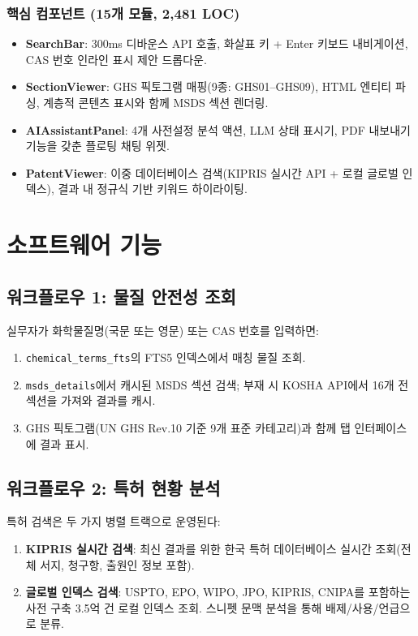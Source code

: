 \documentclass[preprint,12pt]{elsarticle}
\begin{document}
\subsubsection{핵심 컴포넌트 (15개 모듈, 2,481 LOC)}

\begin{itemize}
  \item \textbf{SearchBar}: 300ms 디바운스 API 호출, 화살표 키 + Enter 키보드 내비게이션, CAS 번호 인라인 표시 제안 드롭다운.
  \item \textbf{SectionViewer}: GHS 픽토그램 매핑(9종: GHS01--GHS09), HTML 엔티티 파싱, 계층적 콘텐츠 표시와 함께 MSDS 섹션 렌더링.
  \item \textbf{AIAssistantPanel}: 4개 사전설정 분석 액션, LLM 상태 표시기, PDF 내보내기 기능을 갖춘 플로팅 채팅 위젯.
  \item \textbf{PatentViewer}: 이중 데이터베이스 검색(KIPRIS 실시간 API + 로컬 글로벌 인덱스), 결과 내 정규식 기반 키워드 하이라이팅.
\end{itemize}

\section{소프트웨어 기능}
\label{sec:functionalities}

\subsection{워크플로우 1: 물질 안전성 조회}

실무자가 화학물질명(국문 또는 영문) 또는 CAS 번호를 입력하면:
\begin{enumerate}
  \item \texttt{chemical\_terms\_fts}의 FTS5 인덱스에서 매칭 물질 조회.
  \item \texttt{msds\_details}에서 캐시된 MSDS 섹션 검색; 부재 시 KOSHA API에서 16개 전 섹션을 가져와 결과를 캐시.
  \item GHS 픽토그램(UN GHS Rev.10 기준 9개 표준 카테고리)과 함께 탭 인터페이스에 결과 표시.
\end{enumerate}

\subsection{워크플로우 2: 특허 현황 분석}

특허 검색은 두 가지 병렬 트랙으로 운영된다:
\begin{enumerate}
  \item \textbf{KIPRIS 실시간 검색}: 최신 결과를 위한 한국 특허 데이터베이스 실시간 조회(전체 서지, 청구항, 출원인 정보 포함).
  \item \textbf{글로벌 인덱스 검색}: USPTO, EPO, WIPO, JPO, KIPRIS, CNIPA를 포함하는 사전 구축 3.5억 건 로컬 인덱스 조회. 스니펫 문맥 분석을 통해 배제/사용/언급으로 분류.
\end{enumerate}
\end{document}
